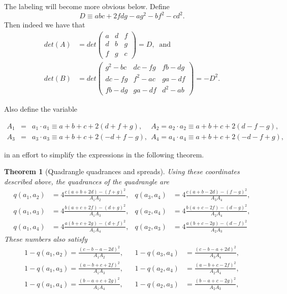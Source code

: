 \documentclass[11pt]{article}
\newtheorem{theorem}{Theorem}
\begin{document}
The labeling will become more obvious below. Define 
\begin{equation*}
D\equiv abc+2fdg-ag^{2}-bf^{2}-cd^{2}.
\end{equation*}%
Then indeed we have that 
\begin{align*}
det(A)& =det%
\begin{pmatrix}
a & d & f \\ 
d & b & g \\ 
f & g & c%
\end{pmatrix}%
=D,\;\;\text{and} \\
det(B)& =det%
\begin{pmatrix}
g^{2}-bc & dc-fg & fb-dg \\ 
dc-fg & f^{2}-ac & ga-df \\ 
fb-dg & ga-df & d^{2}-ab%
\end{pmatrix}%
=-D^{2}.
\end{align*}

Also define the variable

\begin{eqnarray*}
A_{1} &=&a_{1}\cdot a_{1}\equiv a+b+c+2\left( d+f+g\right) ,~\quad
A_{2}=a_{2}\cdot a_{2}\equiv a+b+c+2\left( d-f-g\right) ,~~ \\
A_{3} &=&a_{3}\cdot a_{3}\equiv a+b+c+2\left( -d+f-g\right)
,~~A_{4}=a_{4}\cdot a_{4}\equiv a+b+c+2(-d-f+g),
\end{eqnarray*}

in an effort to simplify the expressions in the following theorem.

\begin{theorem}[Quadrangle quadrances and spreads]
Using these coordinates described above, the quadrances of the quadrangle
are 
\begin{align*}
q(a_{1},a_{2})& =4\frac{c(a+b+2d)-(f+g)^{2}}{A_{1}A_{2}}, & q(a_{3},a_{4})&
=4\frac{c(a+b-2d)-(f-g)^{2}}{A_{3}A_{4}}, \\
q(a_{1},a_{3})& =4\frac{b(a+c+2f)-(d+g)^{2}}{A_{1}A_{3}}, & q(a_{2},a_{4})&
=4\frac{b(a+c-2f)-(d-g)^{2}}{A_{2}A_{4}}, \\
q(a_{1},a_{4})& =4\frac{a(b+c+2g)-(d+f)^{2}}{A_{1}A_{4}}, & q(a_{2},a_{3})&
=4\frac{a(b+c-2g)-(d-f)^{2}}{A_{2}A_{3}}
\end{align*}%
These numbers also satisfy 
\begin{align*}
1-q(a_{1},a_{2})=\frac{(c-b-a-2d)^{2}}{A_{1}A_{2}},& & 1-q(a_{3},a_{4})& =%
\frac{(c-b-a+2d)^{2}}{A_{3}A_{4}}, \\
1-q(a_{1},a_{3})=\frac{(a-b+c+2f)^{2}}{A_{1}A_{3}},& & 1-q(a_{2},a_{4})& =%
\frac{(a-b+c-2f)^{2}}{A_{2}A_{4}}, \\
1-q(a_{1},a_{4})=\frac{(b-a+c+2g)^{2}}{A_{1}A_{4}},& & 1-q(a_{2},a_{3})& =%
\frac{(b-a+c-2g)^{2}}{A_{2}A_{3}},
\end{align*}
\end{theorem}
\end{document}
